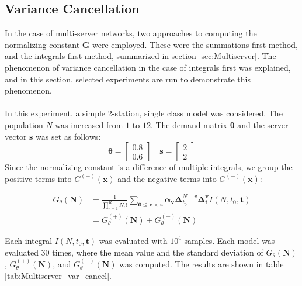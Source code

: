 \subsection{Variance Cancellation}
In the case of multi-server networks, two approaches to computing the normalizing constant \(\mathbf{G}\) were employed. These were the summations first method, and the integrals first method, summarized in section \ref{sec:Multiserver}. The phenomenon of variance cancellation in the case of integrals first was explained, and in this section, selected experiments are run to demonstrate this phenomenon.
\\\\
In this experiment, a simple 2-station, single class model was considered. The population \(N\) was increased from \(1\) to \(12\). The demand matrix \(\boldsymbol{\theta}\) and the server vector \(\mathbf{s}\) was set as follows:
\[ \boldsymbol{\theta} = \left[ \begin{array}{cc}
0.8 \\
0.6
\end{array} \right]
%
\quad
\mathbf{s} = \left[ \begin{array}{cc}
2 \\
2
\end{array} \right]
\]
Since the normalizing constant is a difference of multiple integrals, we group the positive terms into \(G^{(+)}(\mathbf{x})\) and the negative terms into \(G^{(-)}(\mathbf{x})\):

\begin{equation}
\begin{split}
    G_\theta(\mathbf{N}) & = \frac{1}{\prod_{r=1}^R N_r!} \sum_{\mathbf{0 \leq v <s}} \mathbf{\alpha_v} \boldsymbol{\Delta}_{t_0}^{N-v} \boldsymbol{\Delta}_{\mathbf{t}}^{\mathbf{v}} I(N, t_0, \mathbf{t}) \\
    & = G_\theta^{(+)}(\mathbf{N}) + G_\theta^{(-)}(\mathbf{N})
\end{split}
\end{equation}

Each integral \(I(N, t_0, \mathbf{t})\) was evaluated with \(10^4\) samples. Each model was evaluated 30 times, where the mean value and the standard deviation of \(G_\theta(\mathbf{N})\), \(G_\theta^{(+)}(\mathbf{N})\), and \(G_\theta^{(-)}(\mathbf{N})\) was computed. The results are shown in table \ref{tab:Multiserver_var_cancel}.\\

